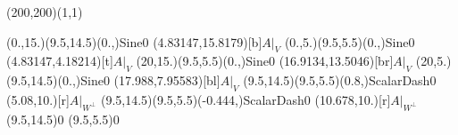\unitlength=1bp%

\begin{feynartspicture}(200,200)(1,1)

\FADiagram{}
\FAProp(0.,15.)(9.5,14.5)(0.,){Sine}{0}
\FALabel(4.83147,15.8179)[b]{$A|_V$}
\FAProp(0.,5.)(9.5,5.5)(0.,){Sine}{0}
\FALabel(4.83147,4.18214)[t]{$A|_V$}
\FAProp(20,15.)(9.5,5.5)(0.,){Sine}{0}
\FALabel(16.9134,13.5046)[br]{$A|_V$}
\FAProp(20,5.)(9.5,14.5)(0.,){Sine}{0}
\FALabel(17.988,7.95583)[bl]{$A|_V$}
\FAProp(9.5,14.5)(9.5,5.5)(0.8,){ScalarDash}{0}
\FALabel(5.08,10.)[r]{$A|_{W^\perp}$}
\FAProp(9.5,14.5)(9.5,5.5)(-0.444,){ScalarDash}{0}
\FALabel(10.678,10.)[r]{$A|_{W^\perp}$}
\FAVert(9.5,14.5){0}
\FAVert(9.5,5.5){0}
\end{feynartspicture}

